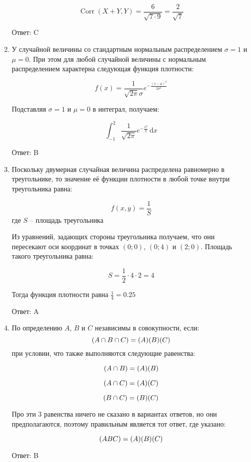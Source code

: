 \documentclass[11pt, a4paper]{article}
\DeclareMathOperator{\Corr}{Corr}
\let\P\relax
\DeclareMathOperator{\P}{\mathbb{P}}
\newcommand{\dx}[1]{\,\mathrm{d}#1} %
\theoremstyle{definition}
\begin{document}
\begin{enumerate}
	\[
	\Corr(X+Y,Y)=\frac{6}{\sqrt{7\cdot9}}=\frac{2}{\sqrt{7}}
	\]
	
	Ответ: C
	
	
	
	\item 
	
	У случайной величины со стандартным нормальным распределением $\sigma=1$ и $\mu=0$. 
	При этом для любой случайной величины с нормальным распределением характерна следующая функция плотности:
	
	\[
	f(x)=\frac{1}{\sqrt{2\pi}\sigma} e^{-\frac{(x-\mu)^2}{2\sigma^2}}
	\]
	
	Подставляя $\sigma=1$ и $\mu=0$ в интеграл, получаем:
	
	\[
	\int_{-1}^{2} \frac{1}{\sqrt{2\pi}} e^{-\frac{x^2}{2}}\dx x
	\]
	
	Ответ: B
	
	
	
	\item 
	
	Поскольку двумерная случайная величина распределена равномерно в треугольнике, то значение её функции плотности в любой точке внутри треугольника равна:
	
	\[
	f(x,y)=\frac{1}{S}
	\]
	где $S$ -- площадь треугольника
	
	Из уравнений, задающих стороны треугольника получаем, что они пересекают оси координат в точках $(0;0)$, $(0;4)$ и $(2;0)$. 
	Площадь такого треугольника равна:
	
	\[
	S=\frac{1}{2} \cdot 4 \cdot 2=4 
	\]
	
	Тогда функция плотности равна $\frac{1}{4}=0.25$
	
	Ответ: A
	
	
	\item 
	
	По определению $A$, $B$ и $C$ независимы в совокупности, если: 
	\[
	\P(A\cap B\cap C)=\P(A)\P(B)\P(C)
	\] 
	при условии, что также выполняются следующие равенства:
	
	\[
	\P(A\cap B)=\P(A)\P(B)
	\]
	
	\[
	\P(A\cap C)=\P(A)\P(C)
	\]
	
	\[
	\P(B\cap C)=\P(B)\P(C)
	\]
	
	Про эти 3 равенства ничего не сказано в вариантах ответов, но они предполагаются, поэтому правильным является тот ответ, где указано:
	
	\[
	\P(ABC)=\P(A)\P(B)\P(C)
	\]
	
	Ответ: B
	

\end{enumerate}
\end{document}
